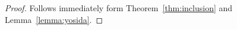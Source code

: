 \documentclass[a4paper,10pt,oneside]{amsbook}
\numberwithin{section}{chapter}
\numberwithin{equation}{chapter}
\theoremstyle{definition}
\newtheorem{cor}[prop]{Corollary}
\DeclareMathOperator{\dom}{dom}
\DeclarePairedDelimiter{\norm}{\lVert}{\rVert}
\DeclarePairedDelimiter{\dual}{\langle}{\rangle}
\begin{document}
\begin{proof}
Follows immediately form Theorem~\ref{thm:inclusion} and Lemma~\ref{lemma:yosida}.
\end{proof}
%
%
\end{document}
